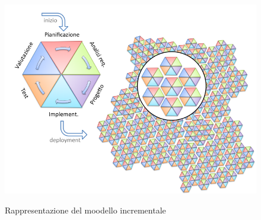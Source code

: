 	
	\begin{figure}[H]
		\centering
		\includegraphics[scale=0.6]{img/modello_incrementale.png}\\
		\caption{Rappresentazione del moodello incrementale}
	\end{figure}
	